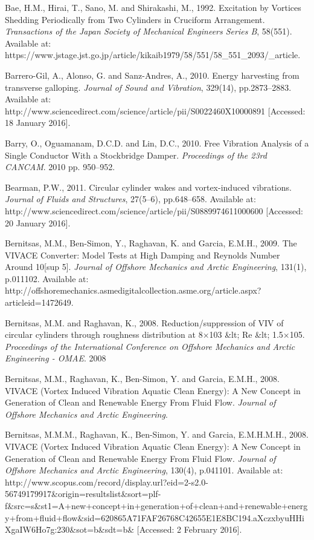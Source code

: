 \documentclass[]{article}
\begin{document}
Bae, H.M., Hirai, T., Sano, M. and Shirakashi, M., 1992. Excitation by
Vortices Shedding Periodically from Two Cylinders in Cruciform
Arrangement. \emph{Transactions of the Japan Society of Mechanical
Engineers Series B}, 58(551). Available at:
https://www.jstage.jst.go.jp/article/kikaib1979/58/551/58\_551\_2093/\_article.

Barrero-Gil, A., Alonso, G. and Sanz-Andres, A., 2010. Energy harvesting
from transverse galloping. \emph{Journal of Sound and Vibration},
329(14), pp.2873--2883. Available at:
http://www.sciencedirect.com/science/article/pii/S0022460X10000891
{[}Accessed: 18 January 2016{]}.

Barry, O., Oguamanam, D.C.D. and Lin, D.C., 2010. Free Vibration
Analysis of a Single Conductor With a Stockbridge Damper.
\emph{Proceedings of the 23rd CANCAM}. 2010 pp. 950--952.

Bearman, P.W., 2011. Circular cylinder wakes and vortex-induced
vibrations. \emph{Journal of Fluids and Structures}, 27(5--6),
pp.648--658. Available at:
http://www.sciencedirect.com/science/article/pii/S0889974611000600
{[}Accessed: 20 January 2016{]}.

Bernitsas, M.M., Ben-Simon, Y., Raghavan, K. and Garcia, E.M.H., 2009.
The VIVACE Converter: Model Tests at High Damping and Reynolds Number
Around 10{[}sup 5{]}. \emph{Journal of Offshore Mechanics and Arctic
Engineering}, 131(1), p.011102. Available at:
http://offshoremechanics.asmedigitalcollection.asme.org/article.aspx?articleid=1472649.

Bernitsas, M.M. and Raghavan, K., 2008. Reduction/suppression of VIV of
circular cylinders through roughness distribution at 8×103 \&lt; Re
\&lt; 1.5×105. \emph{Proceedings of the International Conference on
Offshore Mechanics and Arctic Engineering - OMAE}. 2008

Bernitsas, M.M., Raghavan, K., Ben-Simon, Y. and Garcia, E.M.H., 2008.
VIVACE (Vortex Induced Vibration Aquatic Clean Energy): A New Concept in
Generation of Clean and Renewable Energy From Fluid Flow. \emph{Journal
of Offshore Mechanics and Arctic Engineering}.

Bernitsas, M.M.M., Raghavan, K., Ben-Simon, Y. and Garcia, E.M.H.M.H.,
2008. VIVACE (Vortex Induced Vibration Aquatic Clean Energy): A New
Concept in Generation of Clean and Renewable Energy From Fluid Flow.
\emph{Journal of Offshore Mechanics and Arctic Engineering}, 130(4),
p.041101. Available at:
http://www.scopus.com/record/display.url?eid=2-s2.0-56749179917\&origin=resultslist\&sort=plf-f\&src=s\&st1=A+new+concept+in+generation+of+clean+and+renewable+energy+from+fluid+flow\&sid=620865A71FAF26768C42655E1E8BC194.aXczxbyuHHiXgaIW6Ho7g:230\&sot=b\&sdt=b\&
{[}Accessed: 2 February 2016{]}.
\end{document}
